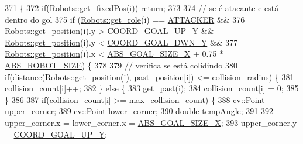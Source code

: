 \begin{DoxyCode}
371                                     \{
372     \textcolor{keywordflow}{if}(\hyperlink{class_robots_af1b330514c96d1cac03a895007b8b54e}{Robots::get\_fixedPos}(i)) \textcolor{keywordflow}{return};
373 
374     \textcolor{comment}{// se é atacante e está dentro do gol}
375     \textcolor{keywordflow}{if} (\hyperlink{class_robots_ac5cdd16502bd325581fb2d732169a326}{Robots::get\_role}(i) == \hyperlink{strategy_8cpp_aea4f6064a6384f5525777880f0ef167f}{ATTACKER} &&
376             \hyperlink{class_robots_a1fca8f2f5070176faa6ba1efa2f1ff14}{Robots::get\_position}(i).y > \hyperlink{namespace_c_o_n_s_t_ab1e77f62ff88d04c9aac407f4405add2}{COORD\_GOAL\_UP\_Y} && 
      \hyperlink{class_robots_a1fca8f2f5070176faa6ba1efa2f1ff14}{Robots::get\_position}(i).y < \hyperlink{namespace_c_o_n_s_t_a97382a534273f1ca10b7cdf29fab9d0a}{COORD\_GOAL\_DWN\_Y} &&
377             \hyperlink{class_robots_a1fca8f2f5070176faa6ba1efa2f1ff14}{Robots::get\_position}(i).x < \hyperlink{namespace_c_o_n_s_t_a01f9b9486ce728d46c65c5d2fc2798d4}{ABS\_GOAL\_SIZE\_X} + 0.75 * 
      \hyperlink{namespace_c_o_n_s_t_a8d0d7fe4341b9129cabd565ef16a0640}{ABS\_ROBOT\_SIZE}) \{
378 
379         \textcolor{comment}{// verifica se está colidindo}
380         \textcolor{keywordflow}{if}(\hyperlink{class_strategy_aacce05caed71553c4efd2d28c9c3aa39}{distance}(\hyperlink{class_robots_a1fca8f2f5070176faa6ba1efa2f1ff14}{Robots::get\_position}(i), 
      \hyperlink{class_strategy_af25c3e91e0deb8592eae48c9bf8d2f18}{past\_position}[i]) <= \hyperlink{namespace_c_o_n_s_t_a793c8da95030a92162ffac2d4dbe7a27}{collision\_radius}) \{
381             \hyperlink{class_strategy_a5ca4277b2cb59fbd6732c1ffa91e0760}{collision\_count}[i]++;
382         \} \textcolor{keywordflow}{else} \{
383             \hyperlink{class_strategy_aca1d4847c7663f25e643a5ec3d467da8}{get\_past}(i);
384             \hyperlink{class_strategy_a5ca4277b2cb59fbd6732c1ffa91e0760}{collision\_count}[i] = 0;
385         \}
386 
387         \textcolor{keywordflow}{if}(\hyperlink{class_strategy_a5ca4277b2cb59fbd6732c1ffa91e0760}{collision\_count}[i] >= \hyperlink{namespace_c_o_n_s_t_ac842498e6a58e8876f03a854fc407ca4}{max\_collision\_count}) \{
388             cv::Point upper\_corner;
389             cv::Point lower\_corner;
390             \textcolor{keywordtype}{double} tempAngle;
391 
392             upper\_corner.x = lower\_corner.x = \hyperlink{namespace_c_o_n_s_t_a01f9b9486ce728d46c65c5d2fc2798d4}{ABS\_GOAL\_SIZE\_X};
393             upper\_corner.y = \hyperlink{namespace_c_o_n_s_t_ab1e77f62ff88d04c9aac407f4405add2}{COORD\_GOAL\_UP\_Y};

\end{DoxyCode}
